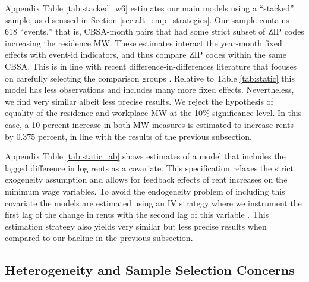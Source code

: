 Appendix Table \ref{tab:stacked_w6} estimates our main models using a 
``stacked'' sample, as discussed in Section \ref{sec:alt_emp_strategies}.
Our sample contains 618 ``events,'' that is, CBSA-month pairs that had some 
strict subset of ZIP codes increasing the residence MW.
These estimates interact the year-month fixed effects with event-id indicators, 
and thus compare ZIP codes within the same CBSA.
This is in line with recent difference-in-differences literature that 
focuses on carefully selecting the comparison groups 
\parencite{CallawayEtAl2021, deChaisemartinEtAl2022, RothEtAl2022}.
Relative to Table \ref{tab:static} this model has less observations and includes 
many more fixed effects.
Nevertheless, we find very similar albeit less precise results.
We reject the hypothesis of equality of the residence and workplace MW at the
10\% significance level.
In this case, a 10 percent increase in both MW measures is estimated to 
increase rents by $0.375$ percent, in line with the results of the previous 
subsection.

Appendix Table \ref{tab:static_ab} shows estimates of a model that includes
the lagged difference in log rents as a covariate.
This specification relaxes the strict exogeneity assumption and allows for 
feedback effects of rent increases on the minimum wage variables.
To avoid the endogeneity problem of including this covariate the models are 
estimated using an IV strategy where we instrument the first lag of the change 
in rents with the second lag of this variable 
\parencite{ArellanoBond1991,ArellanoHonore2001}.
This estimation strategy also yields very similar but less precise results
when compared to our baeline in the previous subsection.

\subsection{Heterogeneity and Sample Selection Concerns}
\label{sec:results_heterogeneity}

